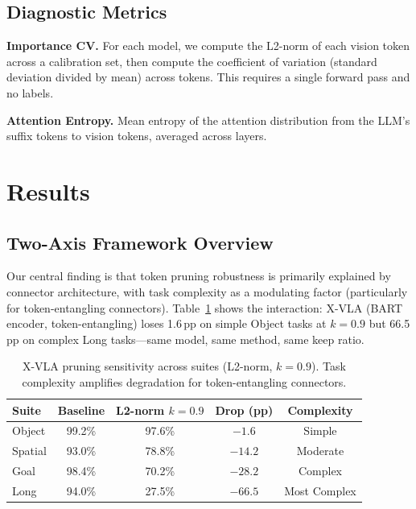 \documentclass[10pt,twocolumn]{article}
\begin{document}
\subsection{Diagnostic Metrics}

\textbf{Importance CV.} For each model, we compute the L2-norm of each vision token across a calibration set, then compute the coefficient of variation (standard deviation divided by mean) across tokens.
This requires a single forward pass and no labels.

\textbf{Attention Entropy.} Mean entropy of the attention distribution from the LLM's suffix tokens to vision tokens, averaged across layers.

\section{Results}

\subsection{Two-Axis Framework Overview}
\label{sec:framework}

Our central finding is that token pruning robustness is primarily explained by connector architecture, with task complexity as a modulating factor (particularly for token-entangling connectors).
Table~\ref{tab:framework_xvla} shows the interaction: X-VLA (BART encoder, token-entangling) loses 1.6\,pp on simple Object tasks at $k\!=\!0.9$ but 66.5\,pp on complex Long tasks---same model, same method, same keep ratio.

\begin{table}[t]
\centering
\caption{X-VLA pruning sensitivity across suites (L2-norm, $k\!=\!0.9$). Task complexity amplifies degradation for token-entangling connectors.}
\label{tab:framework_xvla}
\small
\begin{tabular}{@{}lcccc@{}}
\toprule
Suite & Baseline & L2-norm $k\!=\!0.9$ & Drop (pp) & Complexity \\
\midrule
Object & 99.2\% & 97.6\% & $-1.6$ & Simple \\
Spatial & 93.0\% & 78.8\% & $-14.2$ & Moderate \\
Goal & 98.4\% & 70.2\% & $-28.2$ & Complex \\
Long & 94.0\% & 27.5\% & $-66.5$ & Most Complex \\
\bottomrule
\end{tabular}
\end{table}
\end{document}
